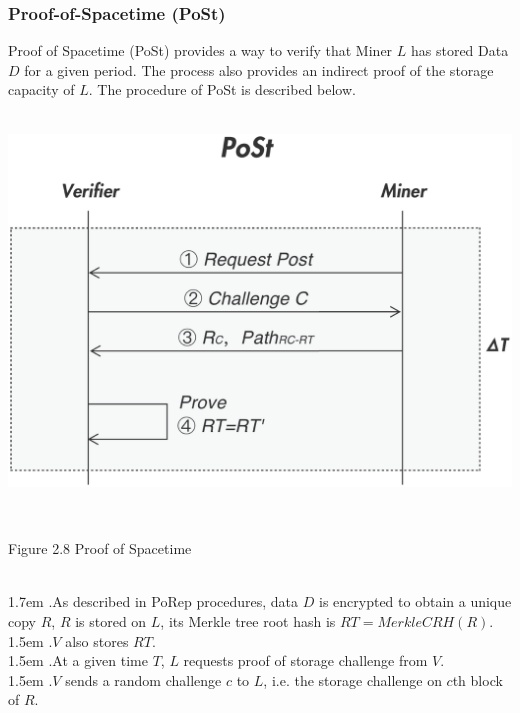 \documentclass[10pt,a4paper]{article}
\begin{document}
        \subsubsection{Proof-of-Spacetime (PoSt)}  %
Proof of Spacetime (PoSt) provides a way to verify that Miner $L$ has stored Data $D$ for a given period. The process also provides an indirect proof of the storage capacity of $L$. The procedure of PoSt is described below.
\vspace{-0.5em}
\\ \\
\centerline{\includegraphics[width=380pt]{fig8}}
 \\\centerline{{Figure 2.8 Proof of Spacetime}}
 \vspace{-1.5em}
\\

\hangindent 1.7em
.\quad As described in PoRep procedures, data $D$ is encrypted to obtain a unique copy $R$, $R$ is stored on $L$, its Merkle tree root hash is $RT=MerkleCRH(R)$.
\vspace{-0.8em}
\\

\hangindent 1.5em
.\quad $V$ also stores $RT$.
\vspace{-0.8em}
\\

\hangindent 1.5em
.\quad At a given time $T$, $L$ requests proof of storage challenge from $V$.
\vspace{-0.8em}
\\

\hangindent 1.5em
.\quad $V$ sends a random challenge $c$ to $L$, i.e. the storage challenge on $c$th block of $R$.
\vspace{-0.8em}
\\
\end{document}

